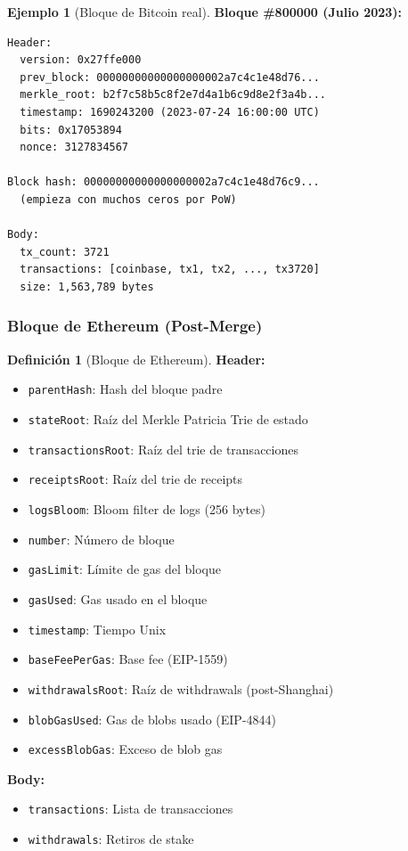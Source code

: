 \documentclass[11pt,a4paper,twoside,openright]{book}
\theoremstyle{definition}
\newtheorem{definition}{Definición}[chapter]
\newtheorem{example}{Ejemplo}[chapter]
\theoremstyle{plain}
\theoremstyle{remark}
\begin{document}
\begin{example}[Bloque de Bitcoin real]
\textbf{Bloque \#800000 (Julio 2023):}
\begin{verbatim}
Header:
  version: 0x27ffe000
  prev_block: 00000000000000000002a7c4c1e48d76...
  merkle_root: b2f7c58b5c8f2e7d4a1b6c9d8e2f3a4b...
  timestamp: 1690243200 (2023-07-24 16:00:00 UTC)
  bits: 0x17053894
  nonce: 3127834567
  
Block hash: 00000000000000000002a7c4c1e48d76c9...
  (empieza con muchos ceros por PoW)

Body:
  tx_count: 3721
  transactions: [coinbase, tx1, tx2, ..., tx3720]
  size: 1,563,789 bytes
\end{verbatim}
\end{example}

\subsubsection{Bloque de Ethereum (Post-Merge)}

\begin{definition}[Bloque de Ethereum]
\textbf{Header:}
\begin{itemize}
    \item \texttt{parentHash}: Hash del bloque padre
    \item \texttt{stateRoot}: Raíz del Merkle Patricia Trie de estado
    \item \texttt{transactionsRoot}: Raíz del trie de transacciones
    \item \texttt{receiptsRoot}: Raíz del trie de receipts
    \item \texttt{logsBloom}: Bloom filter de logs (256 bytes)
    \item \texttt{number}: Número de bloque
    \item \texttt{gasLimit}: Límite de gas del bloque
    \item \texttt{gasUsed}: Gas usado en el bloque
    \item \texttt{timestamp}: Tiempo Unix
    \item \texttt{baseFeePerGas}: Base fee (EIP-1559)
    \item \texttt{withdrawalsRoot}: Raíz de withdrawals (post-Shanghai)
    \item \texttt{blobGasUsed}: Gas de blobs usado (EIP-4844)
    \item \texttt{excessBlobGas}: Exceso de blob gas
\end{itemize}

\textbf{Body:}
\begin{itemize}
    \item \texttt{transactions}: Lista de transacciones
    \item \texttt{withdrawals}: Retiros de stake
\end{itemize}
\end{definition}
\end{document}
